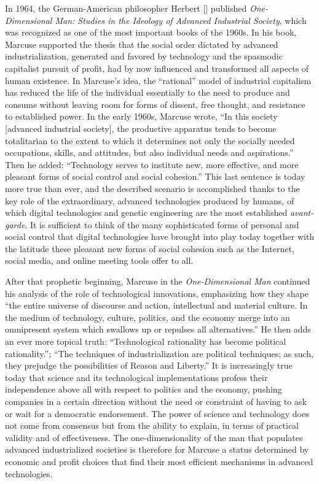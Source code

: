In 1964, the German-American philosopher Herbert \citeauthor{chap:8:Marcuse:1964} [\citeyear{chap:8:Marcuse:1964}] published \textit{One-Dimensional Man: Studies in the Ideology of Advanced Industrial Society}, which was recognized as one of the most important books of the 1960s. In his book, Marcuse supported the thesis that the social order dictated by advanced industrialization, generated and favored by technology and the spasmodic capitalist pursuit of profit, had by now influenced and transformed all aspects of human existence. In Marcuse's idea, the ``rational'' model of industrial capitalism has reduced the life of the individual essentially to the need to produce and consume without leaving room for forms of dissent, free thought, and resistance to\vadjust{\vspace*{-16pt}\pagebreak} established power. In the early 1960s, Marcuse wrote, ``In this society [advanced industrial society], the productive apparatus tends to become totalitarian to the extent to which it determines not only the socially needed occupations, skills, and attitudes, but also individual needs and aspirations.'' Then he added: ``Technology serves to institute new, more effective, and more pleasant forms of social control and social cohesion.'' This last sentence is today more true than ever, and the described scenario is accomplished thanks to the key role of the extraordinary, advanced technologies produced by humans, of which digital technologies and genetic engineering are the most established \textit{avant-garde}. It is sufficient to think of the many sophisticated forms of personal and social control that digital technologies have brought into play today together with the latitude these pleasant new forms of social cohesion such as the Internet, social media, and online meeting tools offer to all.

After that prophetic beginning, Marcuse in the \textit{One-Dimensional Man} continued his analysis of the role of technological innovations, emphasizing how they shape ``the entire universe of discourse and action, intellectual and material culture. In the medium of technology, culture, politics, and the economy merge into an omnipresent system which swallows up or repulses all alternatives.'' He then adds an ever more topical truth: ``Technological rationality has become political rationality.''; ``The techniques of industrialization are political techniques; as such, they prejudge the possibilities of Reason and Liberty.'' It is increasingly true today that science and its technological implementations profess their independence above all with respect to politics and the economy, pushing companies in a certain direction without the need or constraint of having to ask or wait for a democratic endorsement. The power of science and technology does not come from consensus but from the ability to explain, in terms of practical validity and of effectiveness. The one-dimensionality of the man that populates advanced industrialized societies is therefore for Marcuse a status determined by economic and profit choices that find their most efficient mechanisms in advanced technologies.

